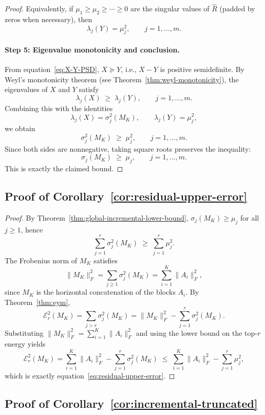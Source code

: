 \documentclass[10pt]{article} %
\def\eqref#1{equation~\ref{#1}}
\begin{document}
\begin{proof}
Equivalently, if $\mu_1\ge\mu_2\ge\cdots\ge 0$ are the singular values of
$\widehat{R}$ (padded by zeros when necessary), then
\[
  \lambda_j(Y) = \mu_j^2,
  \qquad j=1,\dots,m.
\]

\paragraph{Step 5: Eigenvalue monotonicity and conclusion.}
From \eqref{eq:X-Y-PSD}, $X\succeq Y$, i.e., $X-Y$ is positive semidefinite.
By Weyl's monotonicity theorem (see Theorem~\ref{thm:weyl-monotonicity}), the eigenvalues of $X$ and
$Y$ satisfy
\[
  \lambda_j(X) \;\ge\; \lambda_j(Y),
  \qquad j=1,\dots,m.
\]
Combining this with the identities
\[
  \lambda_j(X) = \sigma_j^2(M_K),
  \qquad
  \lambda_j(Y) = \mu_j^2,
\]
we obtain
\[
  \sigma_j^2(M_K) \;\ge\; \mu_j^2,
  \qquad j=1,\dots,m.
\]
Since both sides are nonnegative, taking square roots preserves the
inequality:
\[
  \sigma_j(M_K) \;\ge\; \mu_j,
  \qquad j=1,\dots,m.
\]
This is exactly the claimed bound.
\end{proof}


\subsection{Proof of Corollary~\ref{cor:residual-upper-error}}

\label{appendix:proof-res-cor}

\begin{proof}
By Theorem~\ref{thm:global-incremental-lower-bound}, 
$\sigma_j(M_K) \ge \mu_j$ for all $j\ge 1$, hence
\[
  \sum_{j=1}^r \sigma_j^2(M_K)
  \;\ge\;
  \sum_{j=1}^r \mu_j^2.
\]
The Frobenius norm of $M_K$ satisfies
\[
  \|M_K\|_F^2
  =
  \sum_{j\ge 1} \sigma_j^2(M_K)
  =
  \sum_{i=1}^K \|A_i\|_F^2,
\]
since $M_K$ is the horizontal concatenation of the blocks $A_i$.
By Theorem~\ref{thm:eym},
\[
  \mathcal{E}_r^2(M_K)
  =
  \sum_{j>r} \sigma_j^2(M_K)
  =
  \|M_K\|_F^2 - \sum_{j=1}^r \sigma_j^2(M_K).
\]
Substituting $\|M_K\|_F^2 = \sum_{i=1}^K \|A_i\|_F^2$ and using the lower
bound on the top-$r$ energy yields
\[
  \mathcal{E}_r^2(M_K)
  = \sum_{i=1}^K \|A_i\|_F^2 - \sum_{j=1}^r \sigma_j^2(M_K)
  \;\le\;
  \sum_{i=1}^K \|A_i\|_F^2 - \sum_{j=1}^r \mu_j^2,
\]
which is exactly \eqref{eq:residual-upper-error}.
\end{proof}


\subsection{Proof of Corollary~\ref{cor:incremental-truncated}}
\end{document}
